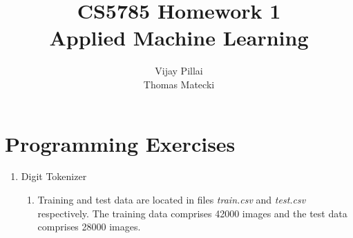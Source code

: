\documentclass{report}
\begin{document}
\title{CS5785 Homework 1\\
\large{
    Applied Machine Learning
}
}


\author{
	Vijay Pillai\\
	Thomas Matecki}
\maketitle
\section*{Programming Exercises}

\begin{enumerate}
	\item Digit Tokenizer
	\begin{enumerate}[label=(\alph*)]
		\item 
		Training and test data are located in files \textit{train.csv} and \textit{test.csv} respectively. The training data comprises 42000 images and the test data comprises 28000 images.


\end{enumerate}
\end{enumerate}
\end{document}
